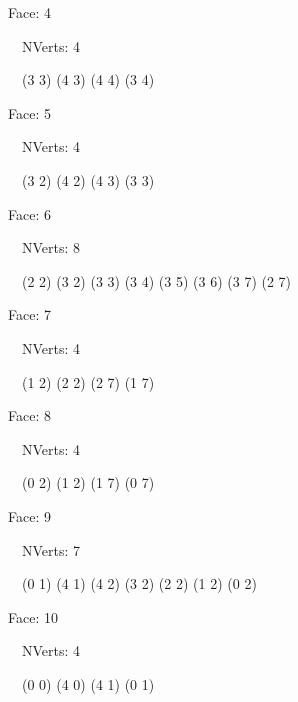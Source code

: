 \documentclass{article}
\begin{document}
    {\footnotesize

    Face: 4

    \   \    NVerts: 4

     \   \   (3 3) (4 3) (4 4) (3 4)}

    {\footnotesize

    Face: 5

    \   \    NVerts: 4

     \   \   (3 2) (4 2) (4 3) (3 3)}

    {\footnotesize

    Face: 6

    \   \    NVerts: 8

     \   \   (2 2) (3 2) (3 3) (3 4) (3 5) (3 6) (3 7) (2 7)}

    {\footnotesize

    Face: 7

    \   \    NVerts: 4

     \   \   (1 2) (2 2) (2 7) (1 7)}

    {\footnotesize

    Face: 8

    \   \    NVerts: 4

     \   \   (0 2) (1 2) (1 7) (0 7)}

    {\footnotesize

    Face: 9

    \   \    NVerts: 7

     \   \   (0 1) (4 1) (4 2) (3 2) (2 2) (1 2) (0 2)}

    {\footnotesize

    Face: 10

    \   \    NVerts: 4

     \   \   (0 0) (4 0) (4 1) (0 1)}


     \newpage
\end{document}
